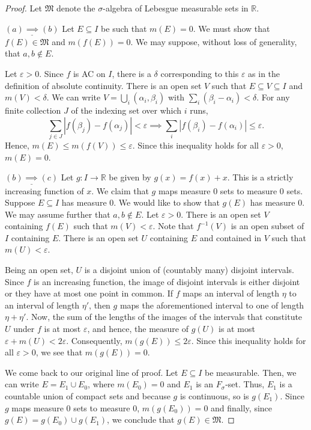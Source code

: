 \documentclass[12pt]{article}
\theoremstyle{thmstyle}
\theoremstyle{defstyle}
\newcommand{\R}{\mathbb{R}}
\newcommand{\frakM}{\mathfrak{M}}
\renewcommand{\le}{\leqslant}
\begin{document}
\begin{proof}
Let $\frakM$ denote the $\sigma$-algebra of Lebesgue measurable sets in $\R$. 

\noindent$\underline{(a)\implies(b)}$ Let $E\subseteq I$ be such that $m(E) = 0$. We must show that $f(E)\in\frakM$ and $m(f(E)) = 0$. We may suppose, without loss of generality, that $a,b\notin E$.

Let $\varepsilon > 0$. Since $f$ is AC on $I$, there is a $\delta$ corresponding to this $\varepsilon$ as in the definition of absolute continuity. There is an open set $V$ such that $E\subseteq V\subseteq I$ and $m(V) < \delta$. We can write $V = \bigcup_i (\alpha_i, \beta_i)$ with $\sum_i (\beta_i - \alpha_i) < \delta$. For any finite collection $J$ of the indexing set over which $i$ runs, 
\begin{equation*}
    \sum_{j\in J}|f(\beta_j) - f(\alpha_j)| < \varepsilon\implies\sum_i|f(\beta_i) - f(\alpha_i)|\le\varepsilon.
\end{equation*}
Hence, $m(E)\le m(f(V))\le\varepsilon$. Since this inequality holds for all $\varepsilon > 0$, $m(E) = 0$.

\noindent$\underline{(b)\implies(c)}$ Let $g: I\to\R$ be given by $g(x) = f(x) + x$. This is a strictly increasing function of $x$. We claim that $g$ maps measure $0$ sets to measure $0$ sets. Suppose $E\subseteq I$ has measure $0$. We would like to show that $g(E)$ has measure $0$. We may assume further that $a,b\notin E$. Let $\varepsilon > 0$. There is an open set $V$ containing $f(E)$ such that $m(V) < \varepsilon$. Note that $f^{-1}(V)$ is an open subset of $I$ containing $E$. There is an open set $U$ containing $E$ and contained in $V$ such that $m(U) < \varepsilon$. 

Being an open set, $U$ is a disjoint union of (countably many) disjoint intervals. Since $f$ is an increasing function, the image of disjoint intervals is either disjoint or they have at most one point in common. If $f$ maps an interval of length $\eta$ to an interval of length $\eta'$, then $g$ maps the aforementioned interval to one of length $\eta + \eta'$. Now, the sum of the lengths of the images of the intervals that constitute $U$ under $f$ is at most $\varepsilon$, and hence, the measure of $g(U)$ is at most $\varepsilon + m(U) < 2\varepsilon$. Consequently, $m(g(E))\le 2\varepsilon$. Since this inequality holds for all $\varepsilon > 0$, we see that $m(g(E)) = 0$.

We come back to our original line of proof. Let $E\subseteq I$ be measurable. Then, we can write $E = E_1\cup E_0$, where $m(E_0) = 0$ and $E_1$ is an $F_\sigma$-set. Thus, $E_1$ is a countable union of compact sets and because $g$ is continuous, so is $g(E_1)$. Since $g$ maps measure $0$ sets to measure $0$, $m(g(E_0)) = 0$ and finally, since $g(E) = g(E_0)\cup g(E_1)$, we conclude that $g(E)\in\frakM$.


\end{proof}
\end{document}
